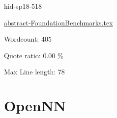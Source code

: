 





\begin{IU}

hid-sp18-518

\href{https://github.com/cloudmesh-community/hid-sp18-518/blob/master//technology/abstract-FoundationBenchmarks.tex}{abstract-FoundationBenchmarks.tex}

 

Wordcount: 405


Quote ratio: 0.00 \%
 
Max Line length: 78
\end{IU}

\section{OpenNN}

